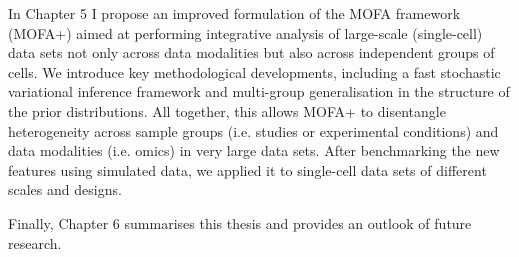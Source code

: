 In Chapter 5 I propose an improved formulation of the MOFA framework (MOFA+) aimed at performing integrative analysis of large-scale (single-cell) data sets not only across data modalities but also across independent groups of cells. We introduce key methodological developments, including a fast stochastic variational inference framework and multi-group generalisation in the structure of the prior distributions. All together, this allows MOFA+ to  disentangle heterogeneity across sample groups (i.e. studies or experimental conditions) and data modalities (i.e. omics) in very large data sets. After benchmarking the new features using simulated data, we applied it to single-cell data sets of different scales and designs.

Finally, Chapter 6 summarises this thesis and provides an outlook of future research.

